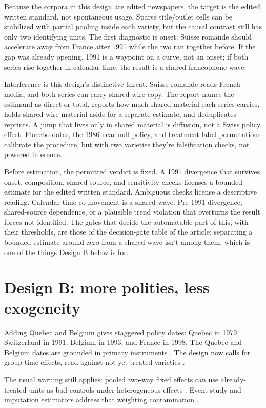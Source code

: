 \documentclass[11pt]{article}
\begin{document}
Because the corpora in this design are edited newspapers, the target is the edited written standard, not spontaneous usage. Sparse title/outlet cells can be stabilized with partial pooling inside each variety, but the causal contrast still has only two identifying units. The first diagnostic is onset: Suisse romande should accelerate away from France after 1991 while the two ran together before. If the gap was already opening, 1991 is a waypoint on a curve, not an onset; if both series rise together in calendar time, the result is a shared francophone wave.

Interference is this design's distinctive threat. Suisse romande reads French media, and both series can carry shared wire copy. The report names the estimand as direct or total, reports how much shared material each series carries, holds shared-wire material aside for a separate estimate, and deduplicates reprints. A jump that lives only in shared material is diffusion, not a Swiss policy effect. Placebo dates, the 1986 near-null policy, and treatment-label permutations calibrate the procedure, but with two varieties they're falsification checks, not powered inference.

Before estimation, the permitted verdict is fixed. A 1991 divergence that survives onset, composition, shared-source, and sensitivity checks licenses a bounded estimate for the edited written standard. Ambiguous checks license a descriptive reading. Calendar-time co-movement is a shared wave. Pre-1991 divergence, shared-source dependence, or a plausible trend violation that overturns the result forces not identified. The gates that decide the automatable part of this, with their thresholds, are those of the decision-gate table of the article; separating a bounded estimate around zero from a shared wave isn't among them, which is one of the things Design B below is for.

\section*{Design B: more polities, less exogeneity}

Adding Quebec and Belgium gives staggered policy dates: Quebec in 1979, Switzerland in 1991, Belgium in 1993, and France in 1998. The Quebec and Belgium dates are grounded in primary instruments \citep{oqlf1979,belgique1993decret}. The design now calls for group-time effects, read against not-yet-treated varieties \citep{CallawaySantAnna2021}.

The usual warning still applies: pooled two-way fixed effects can use already-treated units as bad controls under heterogeneous effects \citep{GoodmanBacon2021,deChaisemartin2020}. Event-study and imputation estimators address that weighting contamination \citep{SunAbraham2021,BorusyakJaravelSpiess2024}.
\end{document}
